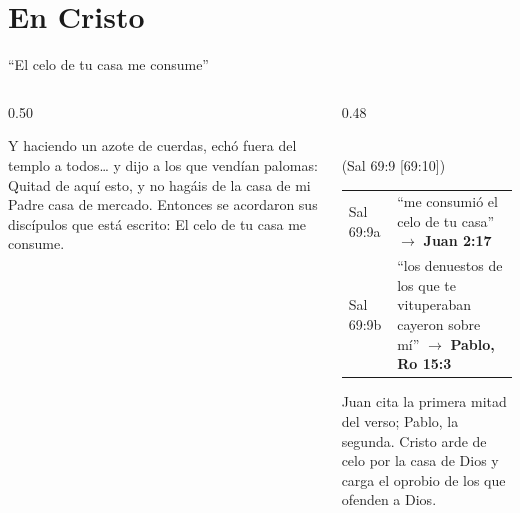 \section{En Cristo}

\begin{frame}{``El celo de tu casa me consume''}
\begin{columns}[t,onlytextwidth]
\begin{column}{0.50\textwidth}
\begin{cita}Y haciendo un azote de cuerdas, echó fuera del templo a todos\ldots{} y dijo a los que vendían palomas: Quitad de aquí esto, y no hagáis de la casa de mi Padre casa de mercado. Entonces se acordaron sus discípulos que está escrito: El celo de tu casa me consume.\end{cita}
\end{column}
\begin{column}{0.48\textwidth}
\begin{center}\\ \footnotesize (Sal 69:9 [69:10])\end{center}
\scriptsize\renewcommand{\arraystretch}{1.15}
\begin{tabular}{@{}>{\RaggedRight\arraybackslash}p{1.6cm}>{\RaggedRight\arraybackslash}p{4.0cm}@{}}
\toprule
Sal 69:9a & ``me consumió el celo de tu casa'' $\rightarrow$ \textbf{Juan 2:17} \\
Sal 69:9b & ``los denuestos de los que te vituperaban cayeron sobre mí'' $\rightarrow$ \textbf{Pablo, Ro 15:3} \\
\bottomrule
\end{tabular}\par\smallskip
\small Juan cita la primera mitad del verso; Pablo, la segunda. Cristo arde de celo por la casa de Dios y carga el oprobio de los que ofenden a Dios.
\end{column}
\end{columns}\par\smallskip
{}
\end{frame}

